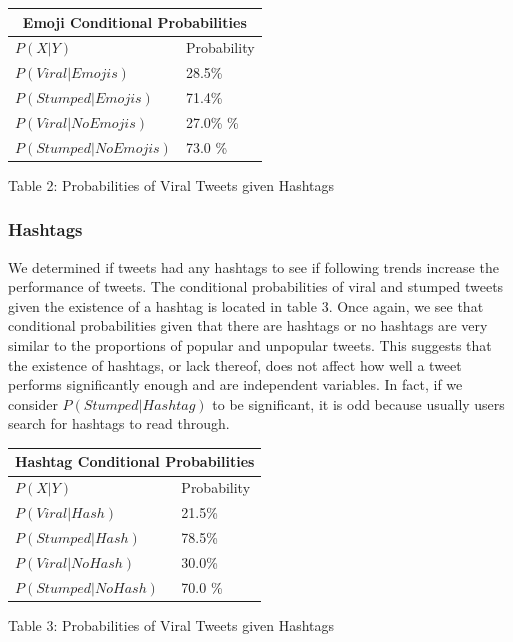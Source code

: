 \documentclass{article}
\begin{document}
{
\begin{tabular}{ |p{3.55 cm}|p{3.45cm}|  }
\hline
\multicolumn{2}{|c|}{Emoji Conditional Probabilities} \\
\hline
$P(X | Y)$ & Probability \\
\hline
$P(Viral | Emojis)$  & 28.5\% \\
$P(Stumped | Emojis)$ & 71.4\% \\
$P(Viral | No Emojis)$ & 27.0\% \% \\
$P(Stumped | No Emojis)$ & 73.0 \%  \\
\hline
\end{tabular}
\centerline{ }

\centerline{Table 2: Probabilities of Viral Tweets given Hashtags}
}

\subsubsection{Hashtags}

We determined if tweets had any hashtags to see if following trends increase the performance of tweets.
The conditional probabilities of viral and stumped tweets given the existence of a hashtag is located in table 3. 
Once again, we see that conditional probabilities given that there are hashtags or no hashtags are very similar to the proportions of popular and unpopular tweets.
This suggests that the existence of hashtags, or lack thereof, does not affect how well a tweet performs significantly enough and are independent variables.
In fact, if we consider $P(Stumped | Hashtag)$ to be significant, it is odd because usually users search for hashtags to read through. \\

{
\begin{tabular}{ |p{3.7 cm}|p{3.3cm}|  }
\hline
\multicolumn{2}{|c|}{Hashtag Conditional Probabilities} \\
\hline
$P(X | Y)$ & Probability \\
\hline
$P(Viral | Hash)$  & 21.5\% \\
$P(Stumped | Hash)$ & 78.5\% \\
$P(Viral | No Hash)$ & 30.0\% \\
$P(Stumped | No Hash)$ & 70.0 \%  \\
\hline
\end{tabular}
\centerline{ }

\centerline{Table 3: Probabilities of Viral Tweets given Hashtags}
}
\end{document}
